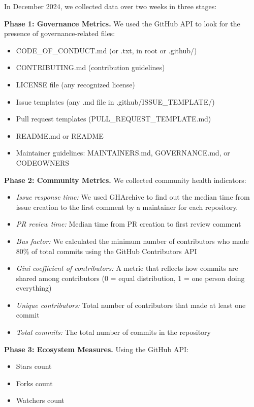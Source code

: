 \documentclass[conference]{IEEEtran}
\begin{document}
In December 2024, we collected data over two weeks in three stages:

\textbf{Phase 1: Governance Metrics.} We used the GitHub API to look for the presence of governance-related files:
\begin{itemize}
    \item CODE\_OF\_CONDUCT.md (or .txt, in root or .github/)
    \item CONTRIBUTING.md (contribution guidelines)
    \item LICENSE file (any recognized license)
    \item Issue templates (any .md file in .github/ISSUE\_TEMPLATE/)
    \item Pull request templates (PULL\_REQUEST\_TEMPLATE.md)
    \item README.md or README
    \item Maintainer guidelines: MAINTAINERS.md, GOVERNANCE.md, or CODEOWNERS
\end{itemize}

\textbf{Phase 2: Community Metrics.} We collected community health indicators:
\begin{itemize}
    \item \textit{Issue response time:} We used GHArchive to find out the median time from issue creation to the first comment by a maintainer for each repository.
    \item \textit{PR review time:} Median time from PR creation to first review comment
    \item \textit{Bus factor:} We calculated the minimum number of contributors who made 80\% of total commits  using the GitHub Contributors API
    \item \textit{Gini coefficient of contributors:} A metric that reflects how commits are shared among contributors (0 = equal distribution, 1 = one person doing everything)
    \item \textit{Unique contributors:} Total number of contributors that made at least one commit
    \item \textit{Total commits:} The total number of commits in the repository
\end{itemize}

\textbf{Phase 3: Ecosystem Measures.} Using the GitHub API:
\begin{itemize}
    \item Stars count
    \item Forks count
    \item Watchers count
\end{itemize}
\end{document}
